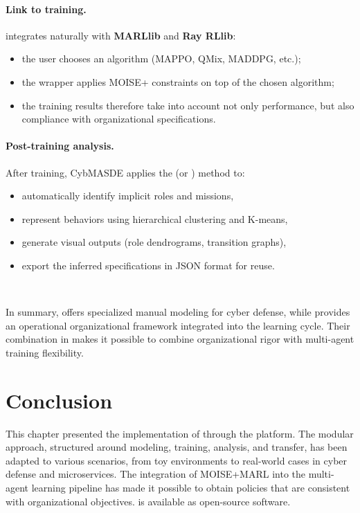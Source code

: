 \paragraph{Link to training.}
 integrates naturally with \textbf{MARLlib} and \textbf{Ray RLlib}:
\begin{itemize}
  \item the user chooses an algorithm (MAPPO, QMix, MADDPG, etc.);
  \item the  wrapper applies MOISE+ constraints on top of the chosen algorithm;
  \item the training results therefore take into account not only performance, but also compliance with organizational specifications.
\end{itemize}

\paragraph{Post-training analysis.}
After training, CybMASDE applies the  (or ) method to:
\begin{itemize}
  \item automatically identify implicit roles and missions,
  \item represent behaviors using hierarchical clustering and K-means,
  \item generate visual outputs (role dendrograms, transition graphs),
  \item export the inferred specifications in JSON format for reuse.
\end{itemize}

\

In summary,  offers specialized manual modeling for cyber defense, while  provides an operational organizational framework integrated into the learning cycle. Their combination in  makes it possible to combine organizational rigor with multi-agent training flexibility.


\section{Conclusion}

This chapter presented the implementation of  through the  platform. The modular approach, structured around modeling, training, analysis, and transfer, has been adapted to various scenarios, from toy environments to real-world cases in cyber defense and microservices.
The integration of MOISE+MARL into the multi-agent learning pipeline has made it possible to obtain policies that are consistent with organizational objectives.  is available as open-source software\footnotemark [1].

